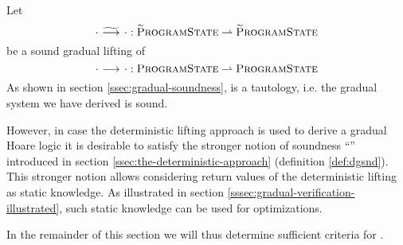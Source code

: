 Let $${\cdot} \,\,{\widetilde{\longrightarrow}^{}}\,\, {\cdot} : \textup{\textsc{\ensuremath{\widetilde{\text{P}}}rogramState}} \rightharpoonup \textup{\textsc{\ensuremath{\widetilde{\text{P}}}rogramState}}$$ be a sound gradual lifting of $${\cdot} \,\,{\longrightarrow^{}}\,\, {\cdot} : \textup{\textsc{ProgramState}} \rightharpoonup \textup{\textsc{ProgramState}}$$
As shown in section \ref{ssec:gradual-soundness},  is a tautology, i.e. the gradual system we have derived is sound.

However, in case the deterministic lifting approach is used to derive a gradual Hoare logic it is desirable to satisfy the stronger notion of soundness “” introduced in section \ref{ssec:the-deterministic-approach} (definition \ref{def:dgsnd}).
This stronger notion allows considering return values of the deterministic lifting as static knowledge.
As illustrated in section \ref{sssec:gradual-verification-illustrated}, such static knowledge can be used for optimizations.

In the remainder of this section we will thus determine sufficient criteria for .


\begin{comment}

Running example:
$$\dgthoare{~}{\qm}{\sAssert{\phiEq{x}{3}}}{\withqmGen{\phiEq{x}{3}}}$$
holds but not
$$\gtHoare{~}{\qm}{\sAssert{\phiEq{x}{3}}}{\withqmGen{\phiEq{x}{3}}}$$

So far, our definition of $\gsssem$ as a total lifting of $\sssem$ may be to weak, breaking the subset relationship:
\begin{description}
    \item[$\sssem$ too weak]
    It is possible that the dynamic semantics of \svl defines
    $$\sssem^{\sAssert{\phiEq{x}{3}}}(\pi_{\phiEq{x}{4}}) = \pi'_{\phiEq{x}{4}}$$
    This is not unreasonable, since this function is guaranteed to be only called with “valid” program states in the static system!
    An additional runtime check would be overhead.
    
    \item[$\gsssem$ too weak]
    If $\sssem^{\sAssert{\phiEq{x}{3}}}(\pi_{\phiEq{x}{4}})$ is undefined due to runtime checks.
    Yet, the lifting is supposed to be total, so passing along the program state unchecked is again a valid realization:
    $$\gsssem^{\sAssert{\phiEq{x}{3}}}(\pi_{\phiEq{x}{4}}) = \pi'_{\phiEq{x}{4}}$$
    Mapping to an exception would have been better in this case.
\end{description}
Note that both problems are unrelated to optimality of the lifting.

\end{comment}

